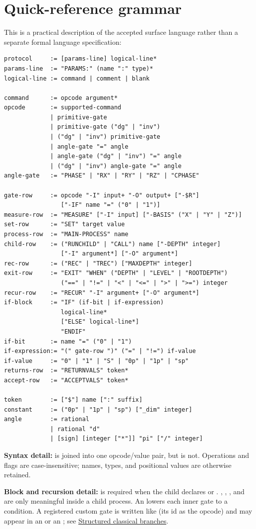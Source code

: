 \section{Quick-reference grammar}

This is a practical description of the accepted surface language rather than a
separate formal language specification:
\begin{lstlisting}[language={}]
protocol     := [params-line] logical-line*
params-line  := "PARAMS:" (name ":" type)*
logical-line := command | comment | blank

command      := opcode argument*
opcode       := supported-command
             | primitive-gate
             | primitive-gate ("dg" | "inv")
             | ("dg" | "inv") primitive-gate
             | angle-gate "=" angle
             | angle-gate ("dg" | "inv") "=" angle
             | ("dg" | "inv") angle-gate "=" angle
angle-gate   := "PHASE" | "RX" | "RY" | "RZ" | "CPHASE"

gate-row     := opcode "-I" input+ "-O" output+ ["-$R"]
                ["-IF" name "=" ("0" | "1")]
measure-row  := "MEASURE" ["-I" input] ["-BASIS" ("X" | "Y" | "Z")]
set-row      := "SET" target value
process-row  := "MAIN-PROCESS" name
child-row    := ("RUNCHILD" | "CALL") name ["-DEPTH" integer]
                ["-I" argument*] ["-O" argument*]
rec-row      := ("REC" | "TREC") ["MAXDEPTH" integer]
exit-row     := "EXIT" "WHEN" ("DEPTH" | "LEVEL" | "ROOTDEPTH")
                ("==" | "!=" | "<" | "<=" | ">" | ">=") integer
recur-row    := "RECUR" "-I" argument+ ["-O" argument*]
if-block     := "IF" (if-bit | if-expression)
                logical-line*
                ["ELSE" logical-line*]
                "ENDIF"
if-bit       := name "=" ("0" | "1")
if-expression:= "(" gate-row ")" ("=" | "!=") if-value
if-value     := "0" | "1" | "S" | "0p" | "1p" | "sp"
returns-row  := "RETURNVALS" token*
accept-row   := "ACCEPTVALS" token*

token        := ["$"] name [":" suffix]
constant     := ("0p" | "1p" | "sp") ["_dim" integer]
angle        := rational
             | rational "d"
             | [sign] [integer ["*"]] "pi" ["/" integer]
\end{lstlisting}

\textbf{Syntax detail:}  is joined into one opcode/value pair,
but  is not. Operations and flags are case-insensitive;
names, types, and positional values are otherwise retained.

\textbf{Block and recursion detail:}  is required when the child
declares  or . , , ,
and  are only meaningful inside a child process. An
 lowers each inner gate to a  condition. A
registered custom gate is written like  (its id as the
opcode) and may appear in an  or an ; see
\hyperlink{if-else-blocks}{Structured classical branches}.
